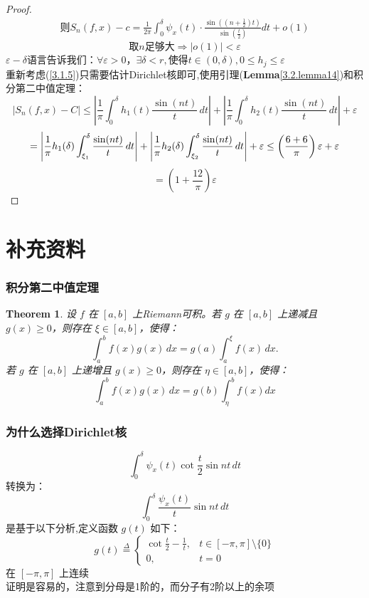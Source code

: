 \documentclass[linespread=1.5,openany]{book}%
\theoremstyle{plain}
\newtheorem{theorem}{Theorem}
\begin{document}
{{{\begin{proof}
{\begin{align}{\text{则}
									S_n(f, x) - c = \frac{1}{2\pi} \int_0^\delta \psi_x(t) \cdot \frac{\sin\left( (n+\frac{1}{2})t \right)}{\sin\left( \frac{t}{2} \right)} dt + o(1) \label{3.1.5} }
							\end{align}\[
							\text{取$n$足够大}\Rightarrow |o(1)|<\varepsilon\]
							$\varepsilon-\delta$语言告诉我们：$\forall \varepsilon>0，\exists \delta<r,$使得$t\in(0,\delta),0\le h_j\le\varepsilon $ \\
							重新考虑(\ref{3.1.5})只需要估计Dirichlet核即可,使用引理(\textbf{Lemma}\ref{3.2.lemma14})和积分第二中值定理：
							\[	\left| S_n(f, x) - C \right| \leq \left| \frac{1}{\pi} \int_0^\delta h_1(t) \frac{\sin(nt)}{t} \, dt \right| + \left| \frac{1}{\pi} \int_0^\delta h_2(t) \frac{\sin(nt)}{t} \, dt \right| + \varepsilon \]
							\[= \left| \frac{1}{\pi} h_1(\delta) \int_{\xi_1 }^{\delta} \frac{\sin(nt)}{t} \, dt \right| + \left| \frac{1}{\pi} h_2(\delta) \int_{\xi_2}^{\delta} \frac{\sin(nt)}{t} \, dt \right| + \varepsilon \\
							\leq \left( \frac{6+6}{\pi} \right) \varepsilon + \varepsilon \]
							\[= \left( 1 + \frac{12}{\pi} \right) \varepsilon\]
						}
					\end{proof}
				}
				\section{补充资料}
				{
					\subsubsection{积分第二中值定理}
					\begin{theorem}
						{设 \( f \) 在 \([a, b]\) 上Riemann可积。若 \( g \) 在 \([a, b]\) 上递减且 \( g(x) \geq 0 \)，则存在 \(\xi \in [a, b]\)，使得：\[\int_a^b f(x) g(x) \, dx = g(a) \int_a^\xi f(x) \, dx.	\]
							若 \( g \) 在 \([a, b]\) 上递增且 \( g(x) \geq 0 \)，则存在 \(\eta \in [a, b]\)，使得：\[\int_a^b f(x) g(x) \, dx = g(b) \int_\eta^b f(x) dx\]
						}
					\end{theorem}
					\subsubsection{为什么选择Dirichlet核}
					{\[\int_0^\delta \psi_x(t) \cot \frac{t}{2} \sin nt \, dt\]
						转换为：\[\int_0^\delta \frac{\psi_x(t)}{t} \sin nt \, dt\]
						是基于以下分析,定义函数 \( g(t) \) 如下：
						\[g(t) \stackrel{\Delta}{=} \begin{cases} \cot \frac{t}{2} - \frac{1}{t}, & t \in [-\pi, \pi] \setminus \{0\} \\0, & t = 0
						\end{cases}
						\]在 \([- \pi, \pi]\) 上连续\\
						证明是容易的，注意到分母是1阶的，而分子有2阶以上的余项}
}}}
\end{document}
